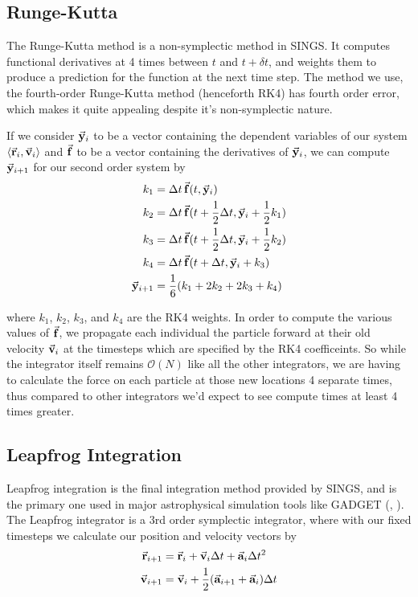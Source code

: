 \documentclass[12pt, twoside, letterpaper]{article}
\begin{document}
\subsection{Runge-Kutta} \label{subsec:rk4}
The Runge-Kutta method is a non-symplectic method in SINGS. It computes functional derivatives at 4 times between $t$ and $t + \delta t$, and weights them to produce a prediction for the function at the next time step. The method we use, the fourth-order Runge-Kutta method (henceforth RK4) has fourth order error, which makes it quite appealing despite it's non-symplectic nature.

If we consider $\va{y}_i$ to be a vector containing the dependent variables of our system $\langle \va{r}_i, \va{v}_i \rangle$ and $\va{f}$ to be a vector containing the derivatives of $\va{y}_i$, we can compute $\va{y}_{i+1}$ for our second order system by 
\begin{subequations} \label{eq:rk4}
	\begin{align}
		k_1 & = \Delta t \, \va{f}(t, \va{y}_i)\\
		k_2 & = \Delta t \, \va{f}(t + \frac{1}{2} \Delta t, \va{y}_i + \frac{1}{2} k_1) \\
		k_3 & = \Delta t \, \va{f}(t + \frac{1}{2} \Delta t, \va{y}_i + \frac{1}{2} k_2) \\
		k_4 & = \Delta t \, \va{f}(t + \Delta t, \va{y}_i + k_3) \\
		\va{y}_{i+1} & = \frac{1}{6}(k_1 + 2k_2 + 2k_3 + k_4)
	\end{align}
\end{subequations}

\noindent where $k_1$, $k_2$, $k_3$, and $k_4$ are the RK4 weights. In order to compute the various values of $\va{f}$, we propagate each individual the particle forward at their old velocity $\va{v}_i$ at the timesteps which are specified by the RK4 coefficeints. So while the integrator itself remains $\mathcal{O}(N)$ like all the other integrators, we are having to calculate the force on each particle at those new locations 4 separate times, thus compared to other integrators we'd expect to see compute times at least 4 times greater.

\subsection{Leapfrog Integration} \label{subsec:leapfrog}
Leapfrog integration is the final integration method provided by SINGS, and is the primary one used in major astrophysical simulation tools like GADGET (\citet{springel2005simulating}, \citet{springel2021simulating}). The Leapfrog integrator is a 3rd order symplectic integrator, where with our fixed timesteps we calculate our position and velocity vectors by
\begin{subequations} \label{eq:leapfrog}
	\begin{align}
		\va{r}_{i+1} & = \va{r}_i + \va{v}_i \Delta t + \va{a}_i \Delta t^2 \\
		\va{v}_{i+1} & = \va{v}_i + \frac{1}{2}(\va{a}_{i+1} + \va{a}_i) \Delta t
	\end{align}		
\end{subequations}
\end{document}
